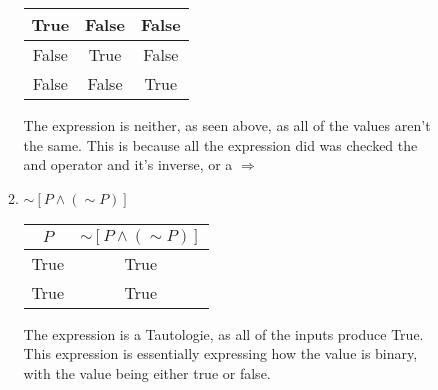 \documentclass{letter}
\begin{document}
\begin{description}
\begin{enumerate}
\begin{enumerate}
\begin{center}
\begin{tabular}{||c|c|c||}
                                    True & False & False \\ \hline
                                    False & True & False \\ \hline
                                    False & False & True \\ \hline
                                    \end{tabular}
                                    \end{center}
The expression is neither, as seen above, as all of the values aren't the same. This is because all the expression did was checked the and operator and it's inverse, or a $\Rightarrow$ \\

				\item $\sim\left[P\wedge (\sim P)\right]$ \\
                                  \begin{center}
                                  \begin{tabular}{||c|c||}
                                    \hline
                                    $P$ & $\sim\left[P\wedge (\sim P)\right]$ \\ \hline
                                    True & True \\ \hline
                                    True & True \\ \hline
\end{tabular}
                                    \end{center}
The expression is a Tautologie, as all of the inputs produce True. This expression is essentially expressing how the value is binary, with the value being either true or false. \\
             

\end{enumerate}
\end{enumerate}
\end{description}
\end{document}

